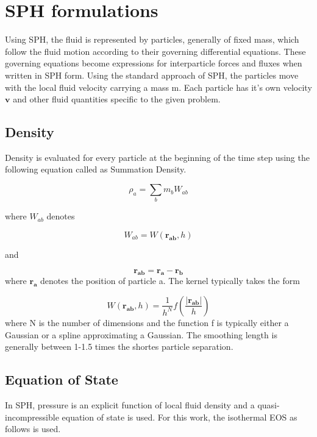 \chapter{SPH formulations}

Using SPH, the fluid is represented by particles, generally of fixed mass, which follow the fluid motion according to their governing differential equations. These governing equations become expressions for interparticle forces and fluxes when written in SPH form. Using the standard approach of SPH, the particles move with the local fluid velocity carrying a mass m. Each particle has it's own velocity $\mathbf{v}$ and other fluid quantities specific to the given problem. 

\section{Density}

Density is evaluated for every particle at the beginning of the time step using the following equation called as Summation Density. 

\begin{equation}
 \rho_a = \sum_b m_b W_{ab}
\end{equation}

\noindent
where $W_{ab}$ denotes

\begin{equation}
 W_{ab} = W(\mathbf{r_{ab}}, h)
\end{equation}

\noindent
and

\begin{equation}
 \mathbf{r_{ab}} = \mathbf{r_a} - \mathbf{r_b}
\end{equation}
\noindent
where $\mathbf{r_a}$ denotes the position of particle a. The kernel typically takes the form

\begin{equation}
 W(\mathbf{r_{ab}}, h)= \frac{1}{h^N} f\left( \frac{\left|\mathbf{r_{ab}} \right|}{h}\right)
\end{equation}
\noindent
where N is the number of dimensions and the function f is typically either a Gaussian or a spline approximating a Gaussian. The smoothing length is generally between 1-1.5 times the shortes particle separation. 

\section{Equation of State}
In SPH, pressure is an explicit function of local fluid density and a quasi-incompressible equation of state is used. For this work, the isothermal EOS as follows is used.

